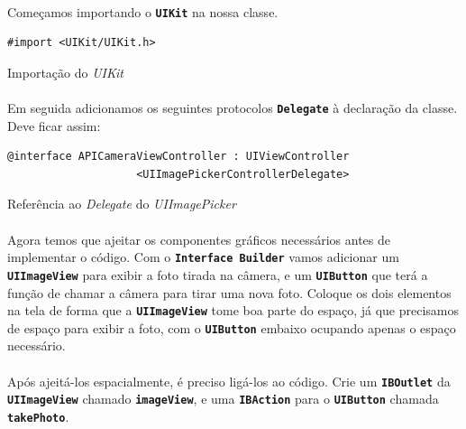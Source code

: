 \documentclass[a4paper,12pt,brazil,doubleside]{book}
\begin{document}
\begin{singlespace}
\paragraph{}Começamos importando o \texttt{\textbf{UIKit}} na nossa classe.

\begin{listing}[H]
\begin{verbatim}
#import <UIKit/UIKit.h>
\end{verbatim}
\caption{Importação do \emph{UIKit}}
\end{listing}

\paragraph{}Em seguida adicionamos os seguintes protocolos \texttt{\textbf{Delegate}} à declaração da classe. Deve ficar assim:

\begin{listing}[H]
\begin{verbatim}
@interface APICameraViewController : UIViewController
                    <UIImagePickerControllerDelegate>
\end{verbatim}
\caption{Referência ao \emph{Delegate} do \emph{UIImagePicker}}
\end{listing}

\paragraph{}Agora temos que ajeitar os componentes gráficos necessários antes de implementar o código. Com o \texttt{\textbf{Interface Builder}} vamos adicionar um \texttt{\textbf{UIImageView}} para exibir a foto tirada na câmera, e um \texttt{\textbf{UIButton}} que terá a função de chamar a câmera para tirar uma nova foto. Coloque os dois elementos na tela de forma que a \texttt{\textbf{UIImageView}} tome boa parte do espaço, já que precisamos de espaço para exibir a foto, com o \texttt{\textbf{UIButton}} embaixo ocupando apenas o espaço necessário.
\paragraph{}Após ajeitá-los espacialmente, é preciso ligá-los ao código. Crie um \texttt{\textbf{IBOutlet}} da \texttt{\textbf{UIImageView}} chamado \texttt{\textbf{imageView}}, e uma \texttt{\textbf{IBAction}} para o \texttt{\textbf{UIButton}} chamada \texttt{\textbf{takePhoto}}.


\end{singlespace}
\end{document}
